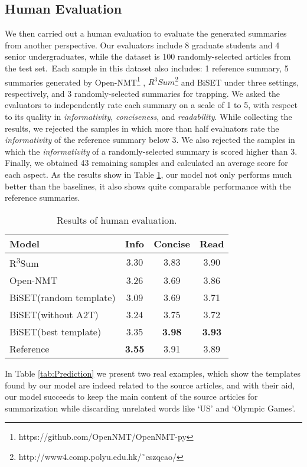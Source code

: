 \documentclass[11pt,a4paper]{article}
\begin{document}
\begin{spacing}{1.0}
\subsection{Human Evaluation}
We then carried out a human evaluation to evaluate the generated summaries from another perspective. Our evaluators include 8 graduate students and 4 senior undergraduates, while the dataset is 100 randomly-selected articles from the test set.~Each sample in this dataset also includes: 1 reference summary, 5 summaries generated by Open-NMT\footnote{https://github.com/OpenNMT/OpenNMT-py} \cite{opennmt}, $R^3Sum$\footnote{http://www4.comp.polyu.edu.hk/˜cszqcao/} \cite{cao2018retrieve} and BiSET under three settings, respectively, and 3 randomly-selected summaries for trapping. We asked the evaluators to independently rate each summary on a scale of 1 to 5, with respect to its quality in \emph{informativity}, \emph{conciseness}, and \emph{readability}. While collecting the results, we rejected the samples in which more than half evaluators rate the \emph{informativity} of the reference summary below 3. We also rejected the samples in which the \emph{informativity} of a randomly-selected summary is scored higher than 3. Finally, we obtained 43 remaining samples and calculated an average score for each aspect. As the results show in Table \ref{tab:human evaluation}, our model not only performs much better than the baselines, it also shows quite comparable performance with the reference summaries.


\begin{table}[h]
	\centering
	\begin{tabular}{@{}l|ccc@{}}
		\toprule
        Model & Info   & Concise & Read  \\
        \hline
        R\textsuperscript{3}Sum & 3.30 & 3.83 & 3.90 \\
        Open-NMT  & 3.26 & 3.69 & 3.86 \\
        BiSET(random template)  & 3.09 & 3.69 & 3.71 \\
        BiSET(without A2T)& 3.24 & 3.75 & 3.72 \\
        BiSET(best template) & 3.35 & \textbf{3.98} & \textbf{3.93} \\
        Reference& \textbf{3.55} & 3.91 & 3.89 \\
        \bottomrule
	\end{tabular}
	\caption{Results of human evaluation.}
\label{tab:human evaluation}
\end{table}

In Table \ref{tab:Prediction} we present two real examples, which show the templates found by our model are indeed related to the source articles, and with their aid, our model succeeds to keep the main content of the source articles for summarization while discarding unrelated words like `US' and `Olympic Games'.


\end{spacing}
\end{document}
